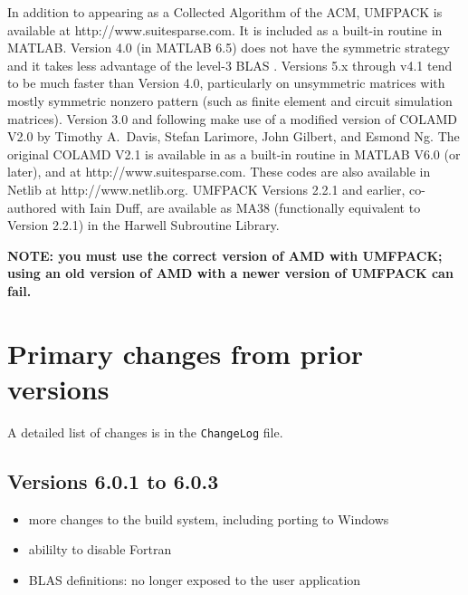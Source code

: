 \documentclass[11pt]{article}
\begin{document}
In addition to appearing as a Collected Algorithm of the ACM,
UMFPACK is available at \newline http://www.suitesparse.com.
It is included as a built-in routine in MATLAB.
Version 4.0 (in MATLAB 6.5)
does not have the symmetric strategy and it takes
less advantage of the level-3
BLAS \cite{DaydeDuff99,ACM679a,ATLAS,GotoVandeGeijn02}.
Versions 5.x through v4.1 tend to be much faster than Version 4.0,
particularly on unsymmetric matrices with mostly symmetric
nonzero pattern (such as finite element and circuit simulation matrices).
Version 3.0 and following make
use of a modified version of COLAMD V2.0 by Timothy A.~Davis, Stefan
Larimore, John Gilbert, and Esmond Ng.  The original COLAMD V2.1 is available in
as a built-in routine in MATLAB V6.0 (or later), and at
http://www.suitesparse.com.
These codes are also available in Netlib \cite{netlib} at
http://www.netlib.org.
UMFPACK Versions 2.2.1 and earlier, co-authored with Iain Duff,
are available as
MA38 (functionally equivalent to Version 2.2.1) in the Harwell
Subroutine Library.

{\bf NOTE: you must use the correct version of AMD with UMFPACK; using
an old version of AMD with a newer version of UMFPACK can fail.}

\section{Primary changes from prior versions}

A detailed list of changes is in the {\tt ChangeLog} file.

\subsection{Versions 6.0.1 to 6.0.3}

\begin{itemize}
    \item more changes to the build system, including porting to Windows
    \item abililty to disable Fortran
    \item BLAS definitions: no longer exposed to the user application
\end{itemize}
\end{document}
